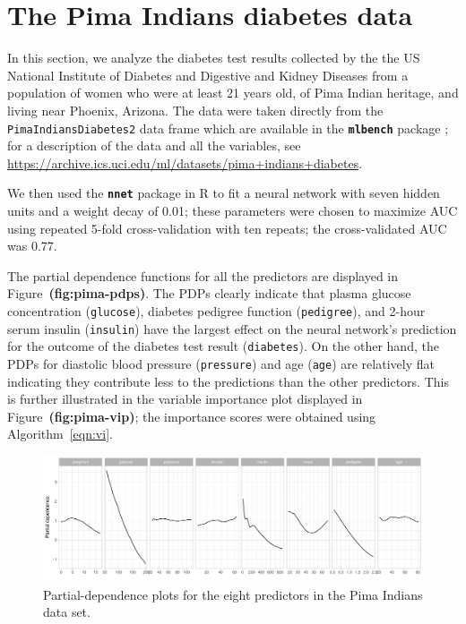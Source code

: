 \documentclass[12pt]{article}
\newcommand{\pkg}[1]{\texorpdfstring%
{{\normalfont\fontseries{b}\selectfont #1}}%
{#1}}
\def\code#1{\texttt{#1}}
\def\pkg#1{\textbf{\texttt{#1}}}
\def\ref#1{\textbf{(#1)}}
\begin{document}
\section{The Pima Indians diabetes data}

In this section, we analyze the diabetes test results collected by the the US National Institute of Diabetes and Digestive and Kidney Diseases from a population of women who were at least 21 years old, of Pima Indian heritage, and living near Phoenix, Arizona. The data were taken directly from the \code{PimaIndiansDiabetes2} data frame which are available in the \pkg{mlbench} package \citep{mlbench-pkg}; for a description of the data and all the variables, see \url{https://archive.ics.uci.edu/ml/datasets/pima+indians+diabetes}.

We then used the \pkg{nnet} package \citep{venables-modern-2002} in R to fit a neural network with seven hidden units and a weight decay of 0.01; these parameters were chosen to maximize AUC using repeated 5-fold cross-validation with ten repeats; the cross-validated AUC was 0.77.

The partial dependence functions for all the predictors are displayed in Figure~\ref{fig:pima-pdps}. The PDPs clearly indicate that plasma glucose concentration (\code{glucose}), diabetes pedigree function (\code{pedigree}), and 2-hour serum insulin (\code{insulin}) have the largest effect on the neural network's prediction for the outcome of the diabetes test result (\code{diabetes}). On the other hand, the PDPs for diastolic blood pressure (\code{pressure}) and age (\code{age}) are relatively flat indicating they contribute less to the predictions than the other predictors. This is further illustrated in the variable importance plot displayed in Figure~\ref{fig:pima-vip}; the importance scores were obtained using Algorithm~\eqref{eqn:vi}.

\begin{figure}[!htb]
  \centering
  \includegraphics[width=1.0\textwidth]{pima-pdps}
  \caption{Partial-dependence plots for the eight predictors in the Pima Indians data set. \label{fig:pima-pdps}}
\end{figure}
\end{document}
